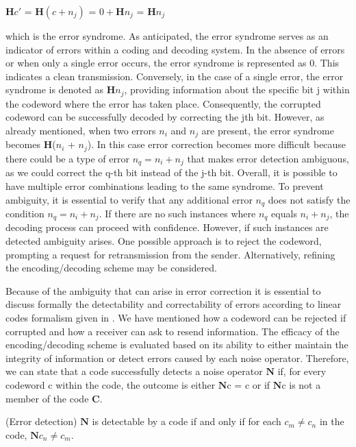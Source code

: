 \documentclass{Configuration_Files/PoliMi3i_thesis}
\begin{document}
\begin{center}
	$\textbf{H}c'$ = $\textbf{H} ( c + n_j )$ = $0 + \textbf{H} n_j $  = $\textbf{H}n_j $ 
\end{center}

which is the error syndrome. As anticipated, the error syndrome serves as an indicator of errors within a coding and decoding system. In the absence of errors or when only a single error occurs, the error syndrome is represented as 0. This indicates a clean transmission. Conversely, in the case of a single error, the error syndrome is denoted as {\bf H}$n_j$, providing information about the specific bit j within the codeword where the error has taken place. Consequently, the corrupted codeword can be successfully decoded by correcting the jth bit. However, as already mentioned, when two errors $n_i$ and $n_j$ are present, the error syndrome becomes {\bf H}($n_i$ + $n_j$). In this case error correction becomes more difficult because there could be a type of error $n_q = n_i + n_j$ that makes error detection ambiguous, as we could correct the q-th bit instead of the j-th bit. Overall, it is possible to have multiple error combinations leading to the same syndrome. To prevent ambiguity, it is essential to verify that any additional error $n_q$ does not satisfy the condition $n_q = n_i + n_j$. If there are no such instances where $n_q$ equals $ n_i + n_j$, the decoding process can proceed with confidence. However, if such instances are detected ambiguity arises. One possible approach is to reject the codeword, prompting a request for retransmission from the sender. Alternatively, refining the encoding/decoding scheme may be considered. \newline

Because of the ambiguity that can arise in error correction it is essential to discuss formally the detectability and correctability of errors according to linear codes formalism given in \cite{Cha06}.
We have mentioned how a codeword can be rejected if corrupted and how a receiver can ask to resend information. The efficacy of the encoding/decoding scheme is evaluated based on its ability to either maintain the integrity of information or detect errors caused by each noise operator. Therefore, we can state that a code successfully detects a noise operator $\textbf{N}$ if, for every codeword c within the code, the outcome is either $\textbf{N}$c = c or if $\textbf{N}$c is not a member of the code $\textbf{C}$.

\begin{theorem}(Error detection)
	$\textbf{N}$ is detectable by a code if and only if for each $c_m \neq c_n$ in the code, $\textbf{N}c_n \neq c_m $.
\end{theorem} 
\end{document}
